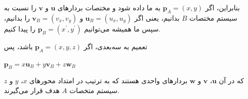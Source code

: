 {\begin{spacing}{1.4}
        بنابراین، اگر $\textbf{p}_{A}=(x, y)$ به ما داده شود و مختصات بردارهای $\textbf{u}$ و $\textbf{v}$ را نسبت به سیستم مختصات $B$ بدانیم،
        یعنی اگر $\textbf{u}_{B}=(u_{x}, u_{y})$ و $\textbf{v}_{B}=(v_{x}, v_{y})$ را بدانیم، سپس ما همیشه می‌توانیم $\textbf{p}_{B}=(x^\prime, y^\prime)$ را پیدا کنیم.

        تعمیم به سه‌بعدی، اگر $\textbf{p}_{A}=(x, y, z)$ باشد، پس

        \begin{center}
            $\textbf{p}_{B}=x\textbf{u}_{B}+y\textbf{v}_{B}+z\textbf{w}_{B}$
        \end{center}

        که در آن $\textbf{u}$، $\textbf{v}$ و $\textbf{w}$ بردارهای واحدی هستند که به ترتیب در امتداد محورهای $x$، $y$ و $z$ سیستم متخصات $A$ هدف قرار می‌گیرند.
    \end{spacing}
}

